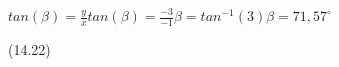 {\begin{mdframed}[linewidth=4, leftmargin=40, rightmargin=40]
\begin{exercise}
\begin{enumerate}[noitemsep, label=\textbf{Step} \textbf{\arabic*}. ]
{\begin{equation}
      \end{equation}
    }{%
    \setlength{\mymathboxwidth}{\columnwidth}
      \addtolength{\mymathboxwidth}{-48pt}
    \par\vspace{12pt}\noindent\begin{minipage}{\columnwidth}
    \parbox[t]{\mymathboxwidth}{\large\begin{math}
    tan\left(\beta \right)=\frac{y}{x}tan\left(\beta \right)=\frac{-3}{-1}\beta ={tan}^{-1}\left(3\right)\beta =71,{57}^{\circ }\end{math}}\hfill
    \parbox[t]{48pt}{\raggedleft 
    (14.22)}
    \end{minipage}\vspace{12pt}\par
    }%
    

\end{enumerate}
\end{exercise}
\end{mdframed}}
